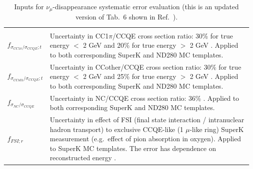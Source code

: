 \begin{table}[htb]
\begin{tabular}{p{}p{}}
{}\\
\parbox{0.12\textwidth}
{ 
    \vspace{0.2cm}
    $f_{\sigma_{CC1\pi}/\sigma_{CCQE};t}$ 
}&
\parbox{0.88\textwidth}
{
    \vspace{0.2cm}
    Uncertainty in CC1$\pi$/CCQE cross section ratio:
    30\% for true energy $<$  2 GeV and 20\% for true energy $>$ 2 GeV \cite{NIWGErr}.
    Applied to both corresponding SuperK and ND280 MC templates.\\
}\\
\parbox{0.12\textwidth}
{ 
    \vspace{0.2cm}
    $f_{\sigma_{CCoth}/\sigma_{CCQE};t}$ 
}&
\parbox{0.88\textwidth}
{
    \vspace{0.2cm}
    Uncertainty in CCother/CCQE cross section ratio:
    30\% for true energy $<$ 2 GeV and 25\% for true energy $>$ 2 GeV \cite{NIWGErr}.
    Applied to both corresponding SuperK and ND280 MC templates.\\ 
}\\
\parbox{0.12\textwidth}
{ 
    \vspace{0.2cm}
    $f_{\sigma_{NC}/\sigma_{CCQE}}$ 
}&
\parbox{0.88\textwidth}
{
    \vspace{0.2cm}
    Uncertainty in NC/CCQE cross section ratio: 36\% \cite{NIWGErr}.
    Applied to both corresponding SuperK and ND280 MC templates.\\   
}\\
\parbox{0.12\textwidth}
{ 
    \vspace{0.2cm}
    $f_{FSI;r}$ 
}&
\parbox{0.88\textwidth}
{
    \vspace{0.2cm}
    Uncertainty in effect of FSI (final state interaction / intranuclear hadron transport)
    to exclusive CCQE-like (1 $\mu$-like ring) SuperK measurement (e.g.\ effect of pion absorption in oxygen).
    Applied to SuperK MC templates.
    The error has dependence on reconstructed energy \cite{NIWGErr}.\\
}\\
\hline
\end{tabular}\\[2pt]
\caption{
  Inputs for $\nu_{\mu}$-disappearance systematic error evaluation (this is an updated version of Tab.\ 6 shown in Ref.\ \cite{OurRun1DisappAnalysis}).
}
\label{tab:input_uncertainties}
\end{table}
